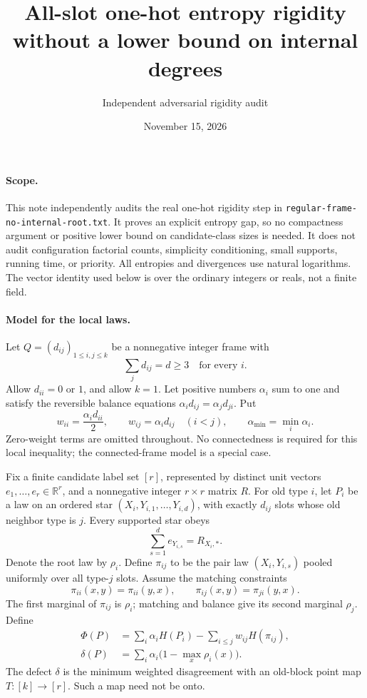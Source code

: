 \documentclass[11pt]{article}
\title{All-slot one-hot entropy rigidity\\without a lower bound on internal degrees}
\author{Independent adversarial rigidity audit}
\date{November 15, 2026}
\begin{document}
\maketitle

\paragraph{Scope.}
This note independently audits the real one-hot rigidity step in
\texttt{regular-frame-no-internal-root.txt}. It proves an explicit entropy
gap, so no compactness argument or positive lower bound on candidate-class
sizes is needed. It does not audit configuration factorial counts,
simplicity conditioning, small supports, running time, or priority.
All entropies and divergences use natural logarithms. The vector identity
used below is over the ordinary integers or reals, not a finite field.

\paragraph{Model for the local laws.}
Let $Q=(d_{ij})_{1\leq i,j\leq k}$ be a nonnegative integer frame with
\[
 \sum_jd_{ij}=d\geq3\quad\text{for every }i.
\]
Allow $d_{ii}=0$ or $1$, and allow $k=1$. Let positive numbers
$\alpha_i$ sum to one and satisfy the reversible balance equations
$\alpha_i d_{ij}=\alpha_jd_{ji}$. Put
\[
 w_{ii}=\frac{\alpha_i d_{ii}}2,\qquad
 w_{ij}=\alpha_i d_{ij}\quad(i<j),\qquad
 \alpha_{\min}=\min_i\alpha_i.
\]
Zero-weight terms are omitted throughout. No connectedness is required
for this local inequality; the connected-frame model is a special case.

Fix a finite candidate label set $[r]$, represented by distinct unit
vectors $e_1,\ldots,e_r\in\mathbb R^r$, and a nonnegative integer
$r\times r$ matrix $R$. For old type $i$, let $P_i$ be a law on an
ordered star $(X_i,Y_{i,1},\ldots,Y_{i,d})$, with exactly $d_{ij}$ slots
whose old neighbor type is $j$. Every supported star obeys
\begin{equation}
 \sum_{s=1}^d e_{Y_{i,s}}=R_{X_i,*}.                 \label{legal}
\end{equation}
Denote the root law by $\rho_i$. Define $\pi_{ij}$ to be the pair law
$(X_i,Y_{i,s})$ pooled uniformly over all type-$j$ slots. Assume the
matching constraints
\[
 \pi_{ii}(x,y)=\pi_{ii}(y,x),\qquad
 \pi_{ij}(x,y)=\pi_{ji}(y,x).
\]
The first marginal of $\pi_{ij}$ is $\rho_i$; matching and balance give
its second marginal $\rho_j$. Define
\begin{equation}
 \begin{split}
 \Phi(P)&=\sum_i\alpha_iH(P_i)
                  -\sum_{i\leq j}w_{ij}H(\pi_{ij}),\\
 \delta(P)&=\sum_i\alpha_i\bigl(1-\max_x\rho_i(x)\bigr).
 \end{split}                                      \label{functional}
\end{equation}
The defect $\delta$ is the minimum weighted disagreement with an
old-block point map $T:[k]\to[r]$. Such a map need not be onto.
\end{document}
